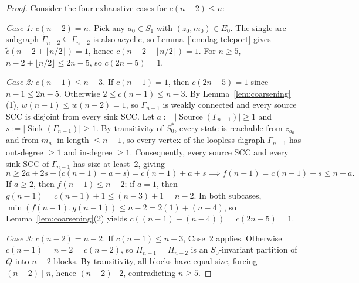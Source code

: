 \documentclass[11pt,a4paper]{article}
\theoremstyle{definition}
\theoremstyle{remark}
\newcommand{\Sink}{\operatorname{Sink}}
\newcommand{\Source}{\operatorname{Source}}
\begin{document}
\begin{proof}
Consider the four exhaustive cases for $c(n - 2) \le n$:

\emph{Case 1: $c(n - 2) = n$.} Pick any $a_0 \in S_1$ with $(z_0, m_0) \in E_0$. The single-arc subgraph $\widetilde{\Gamma}_{n - 2} \subseteq \Gamma_{n - 2}$ is also acyclic, so Lemma~\ref{lem:dag-teleport} gives $\widetilde{c}(n - 2 + \lfloor n / 2 \rfloor) = 1$, hence $c(n - 2 + \lfloor n / 2 \rfloor) = 1$. For $n \ge 5$, $n - 2 + \lfloor n / 2 \rfloor \le 2n - 5$, so $c(2n - 5) = 1$.

\emph{Case 2: $c(n - 1) \le n - 3$.} If $c(n - 1) = 1$, then $c(2n - 5) = 1$ since $n - 1 \le 2n - 5$. Otherwise $2 \le c(n - 1) \le n - 3$. By Lemma~\ref{lem:coarsening}(1), $w(n - 1) \le w(n - 2) = 1$, so $\Gamma_{n - 1}$ is weakly connected and every source SCC is disjoint from every sink SCC. Let $a := |\Source(\Gamma_{n - 1})| \ge 1$ and $s := |\Sink(\Gamma_{n - 1})| \ge 1$. By transitivity of $S_0^*$, every state is reachable from $z_{a_0}$ and from $m_{a_0}$ in length $\le n - 1$, so every vertex of the loopless digraph $\Gamma_{n - 1}$ has out-degree $\ge 1$ and in-degree $\ge 1$. Consequently, every source SCC and every sink SCC of $\Gamma_{n - 1}$ has size at least~$2$, giving
\[
  n \ge 2a + 2s + \bigl(c(n - 1) - a - s\bigr) = c(n - 1) + a + s \implies f(n - 1) = c(n - 1) + s \le n - a.
\]
If $a \ge 2$, then $f(n - 1) \le n - 2$; if $a = 1$, then $g(n - 1) = c(n - 1) + 1 \le (n - 3) + 1 = n - 2$. In both subcases, $\min(f(n - 1), g(n - 1)) \le n - 2 = 2(1) + (n - 4)$, so Lemma~\ref{lem:coarsening}(2) yields $c((n - 1) + (n - 4)) = c(2n - 5) = 1$.

\emph{Case 3: $c(n - 2) = n - 2$.} If $c(n - 1) \le n - 3$, Case~2 applies. Otherwise $c(n - 1) = n - 2 = c(n - 2)$, so $\Pi_{n - 1} = \Pi_{n - 2}$ is an $S_0$-invariant partition of $Q$ into $n - 2$ blocks. By transitivity, all blocks have equal size, forcing $(n - 2) \mid n$, hence $(n - 2) \mid 2$, contradicting $n \ge 5$.


\end{proof}
\end{document}
